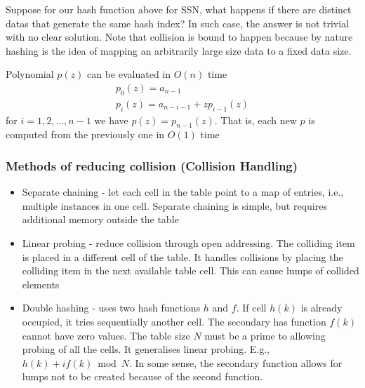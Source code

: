 \documentclass[a4paper]{article}
\theoremstyle{plain}
\theoremstyle{definition}
\newtheorem{defn}{Definition}[section]
\theoremstyle{remark}
\begin{document}
\begin{tcolorbox}[colback=black!3!white,colframe=black!60!white,title=\begin{defn}Collision \label{Collision}\end{defn}]
Suppose for our hash function above for SSN, what happens if there are distinct datas that generate the same hash index? In such case, the answer is not trivial with no clear solution. Note that collision is bound to happen because by nature hashing is the idea of mapping an arbitrarily large size data to a fixed data size.
\end{tcolorbox}
\begin{tcolorbox}[colback=black!3!white,colframe=black!60!white,title=\begin{defn}Horner's Rule \label{Horner's Rule}\end{defn}]
Polynomial $p(z)$ can be evaluated in $O(n)$ time
\begin{align}
p_0(z) = a_{n-1}\\
p_i(z) = a_{n-i-1}+zp_{i-1}(z)
\end{align}
for $i=1,2,\ldots,n-1$ we have $p(z)=p_{n-1}(z)$. That is, each new $p$ is computed from the previously one in $O(1)$ time
\end{tcolorbox}
\subsubsection{Methods of reducing collision (Collision Handling)}
\begin{itemize}
	\item Separate chaining - let each cell in the table point to a map of entries, i.e., multiple instances in one cell. Separate chaining is simple, but requires additional memory outside the table
	\item Linear probing - reduce collision through open addressing. The colliding item is placed in a different cell of the table. It handles collisions by placing the colliding item in the next available table cell. This can cause lumps of collided elements
	\item Double hashing - uses two hash functions $h$ and $f$. If cell $h(k)$ is already occupied, it tries sequentially another cell. The secondary has function $f(k)$ cannot have zero values. The table size $N$ must be a prime to allowing probing of all the cells. It generalises linear probing. E.g., $h(k) + i f(k)  \bmod N $. In some sense, the secondary function allows for lumps not to be created because of the second function.
\end{itemize}
\end{document}
